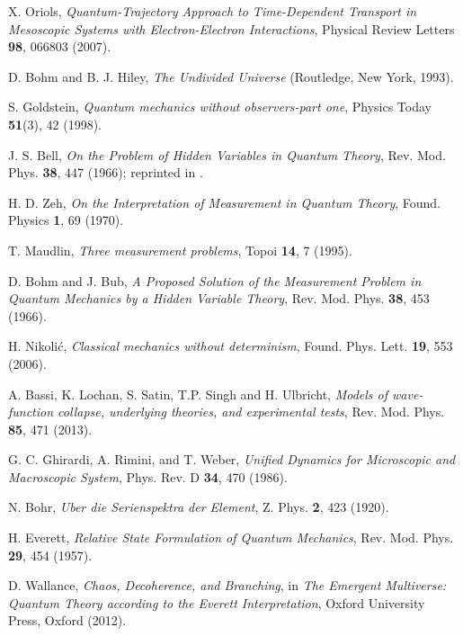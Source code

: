 \documentclass[nofootinbib, secnumarabic, amsmath, nobibnotes,11pt,aps,pra, floatfix]{revtex4-1}
\begin{document}
\begin{thebibliography}{999}
X. Oriols, \emph{Quantum-Trajectory Approach to Time-Dependent Transport in Mesoscopic Systems with Electron-Electron Interactions}, Physical Review Letters \textbf{98},  066803 (2007).

D. Bohm and B. J. Hiley, \emph{The Undivided Universe} (Routledge, New York, 1993).

S. Goldstein, \emph{Quantum mechanics without observers-part one}, Physics Today \textbf{51}(3),  42 (1998).

J. S. Bell, \emph{On the Problem of Hidden Variables in Quantum Theory}, Rev. Mod. Phys. \textbf{38},  447 (1966); reprinted in \cite{om.Bell1987}.

H. D. Zeh, 
\textit{On the Interpretation of Measurement in Quantum Theory}, 
Found. Physics \textbf{1},  69 (1970).

T. Maudlin, 
\textit{Three measurement problems},
Topoi \textbf{14}, 7 (1995).

D. Bohm and J. Bub, 
\textit{A Proposed Solution of the Measurement Problem in Quantum Mechanics by a Hidden Variable Theory},
Rev. Mod. Phys. \textbf{38}, 453 (1966).

H. Nikoli\'c,
\textit{Classical mechanics without determinism},
Found. Phys. Lett. \textbf{19}, 553 (2006).

A. Bassi, K. Lochan, S. Satin, T.P. Singh  and H. Ulbricht, 
\textit{Models of wave-function collapse, underlying theories, and experimental tests}, 
Rev. Mod. Phys. \textbf{85}, 471 (2013).

G. C. Ghirardi, A. Rimini, and T. Weber,
\textit{Unified Dynamics for Microscopic and Macroscopic System},
Phys. Rev. D \textbf{34}, 470 (1986).

N. Bohr,
\textit{Uber die Serienspektra der Element},
Z. Phys. \textbf{2}, 423 (1920).

H. Everett,
\textit{Relative State Formulation of Quantum Mechanics},
Rev. Mod. Phys. \textbf{29},  454 (1957).

D. Wallance,
\textit{Chaos, Decoherence, and Branching},
in \textit{The Emergent Multiverse: Quantum Theory according to the Everett Interpretation},
Oxford University Press, Oxford (2012).


\end{thebibliography}
\end{document}
